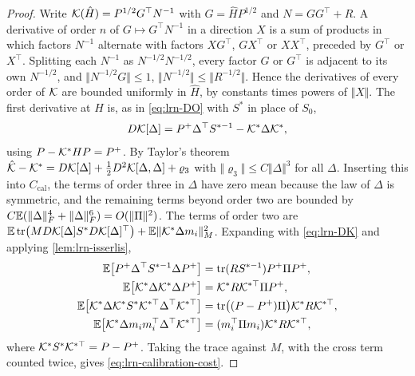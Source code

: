 \begin{proof}
Write $\mathcal{K}(\hat H)=P^{1/2}G^\top N^{-1}$ with $G=\hat HP^{1/2}$ and $N=GG^\top+R$. A derivative of order $n$ of $G\mapsto G^\top N^{-1}$ in a direction $X$ is a sum of products in which factors $N^{-1}$ alternate with factors $XG^\top$, $GX^\top$ or $XX^\top$, preceded by $G^\top$ or $X^\top$. Splitting each $N^{-1}$ as $N^{-1/2}N^{-1/2}$, every factor $G$ or $G^\top$ is adjacent to its own $N^{-1/2}$, and $\Vert N^{-1/2}G\Vert\le1$, $\Vert N^{-1/2}\Vert\le\Vert R^{-1/2}\Vert$. Hence the derivatives of every order of $\mathcal{K}$ are bounded uniformly in $\hat H$, by constants times powers of $\Vert X\Vert$. The first derivative at $H$ is, as in \cref{eq:lrn-DO} with $S^\ast$ in place of $S_0$,
\begin{equation}\label{eq:lrn-DK}
D\mathcal{K}[\Delta]=P^+\Delta^\top S^{\ast-1}-\mathcal{K}^\ast\Delta\mathcal{K}^\ast,
\end{equation}
using $P-\mathcal{K}^\ast HP=P^+$. By Taylor's theorem $\hat{\mathcal{K}}-\mathcal{K}^\ast=D\mathcal{K}[\Delta]+\tfrac12D^2\mathcal{K}[\Delta,\Delta]+\varrho_3$ with $\Vert\varrho_3\Vert\le C\Vert\Delta\Vert^3$ for all $\Delta$. Inserting this into $C_{\mathrm{cal}}$, the terms of order three in $\Delta$ have zero mean because the law of $\Delta$ is symmetric, and the remaining terms beyond order two are bounded by $C\mathbb{E}(\Vert\Delta\Vert_F^4+\Vert\Delta\Vert_F^6)=O(\Vert\Pi\Vert^2)$. The terms of order two are $\mathbb{E}\operatorname{tr}\bigl(MD\mathcal{K}[\Delta]S^\ast D\mathcal{K}[\Delta]^\top\bigr)+\mathbb{E}\Vert\mathcal{K}^\ast\Delta m_i\Vert_M^2$. Expanding with \cref{eq:lrn-DK} and applying \cref{lem:lrn-isserlis},
\begin{align*}
\mathbb{E}\bigl[P^+\Delta^\top S^{\ast-1}\Delta P^+\bigr]&=\operatorname{tr}(RS^{\ast-1})P^+\Pi P^+,\\
\mathbb{E}\bigl[\mathcal{K}^\ast\Delta\mathcal{K}^\ast\Delta P^+\bigr]&=\mathcal{K}^\ast R\mathcal{K}^{\ast\top}\Pi P^+,\\
\mathbb{E}\bigl[\mathcal{K}^\ast\Delta\mathcal{K}^\ast S^\ast\mathcal{K}^{\ast\top}\Delta^\top\mathcal{K}^{\ast\top}\bigr]&=\operatorname{tr}\bigl((P-P^+)\Pi\bigr)\mathcal{K}^\ast R\mathcal{K}^{\ast\top},\\
\mathbb{E}\bigl[\mathcal{K}^\ast\Delta m_im_i^\top\Delta^\top\mathcal{K}^{\ast\top}\bigr]&=(m_i^\top\Pi m_i)\mathcal{K}^\ast R\mathcal{K}^{\ast\top},
\end{align*}
where $\mathcal{K}^\ast S^\ast\mathcal{K}^{\ast\top}=P-P^+$. Taking the trace against $M$, with the cross term counted twice, gives \cref{eq:lrn-calibration-cost}.
\end{proof}

